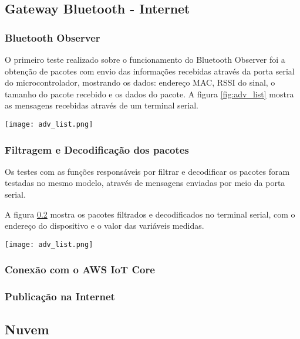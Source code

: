 \subsection{Gateway Bluetooth - Internet}

\subsubsection{Bluetooth Observer}
 
O primeiro teste realizado sobre o funcionamento do Bluetooth Observer foi a
obtenção de pacotes com envio das informações recebidas através da porta serial
do microcontrolador, mostrando os dados: endereço MAC, RSSI do sinal, o tamanho
do pacote recebido e os dados do pacote. A figura \ref{fig:adv_list} mostra as
mensagens recebidas através de um terminal serial.

\begin{center}
	\centering 
	\texttt{[image: adv\_list.png]}
	\label{fig:adv_list}
\end{center} 

\subsubsection{Filtragem e Decodificação dos pacotes}
Os testes com as funções responsáveis por filtrar e decodificar os pacotes foram
testadas no mesmo modelo, através de mensagens enviadas por meio da porta
serial.

A figura \ref{} mostra os pacotes filtrados e decodificados no terminal serial,
com o endereço do dispositivo e o valor das variáveis medidas.

\begin{center}
	\centering 
	\texttt{[image: adv\_list.png]}
	\label{fig:adv_list}
\end{center} 


\subsubsection{Conexão com o AWS IoT Core}

\subsubsection{Publicação na Internet}

\subsection{Nuvem}

